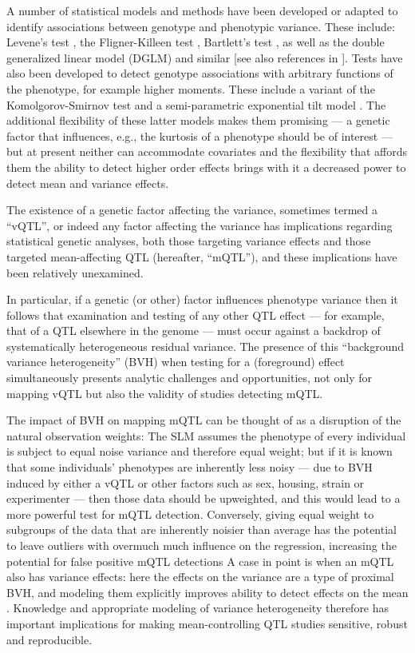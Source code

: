 A number of statistical models and methods have been developed or adapted to identify associations between genotype and phenotypic variance. 
These include: 
    Levene's test \citep{Struchalin2010},
    the Fligner-Killeen test \citep{Fraser2010},
    Bartlett's test \citep{Freund2013b},
    as well as the double generalized linear model (DGLM) and similar \citep{Ronnegard2011a, Cao2014} [see also references in \citep{Ronnegard2012}].
Tests have also been developed to detect genotype associations with arbitrary functions of the phenotype, for example higher moments.
These include a variant of the Komolgorov-Smirnov test \citep{Aschard2013} and a semi-parametric exponential tilt model \citep{Hong2016}.
The additional flexibility of these latter models makes them promising --- a genetic factor that influences, e.g., the kurtosis of a phenotype should be of interest --- but at present neither can accommodate covariates and the flexibility that affords them the ability to detect higher order effects brings with it a decreased power to detect mean and variance effects. 


The existence of a genetic factor affecting the variance, sometimes termed a ``vQTL'', or indeed any factor affecting the variance has implications regarding statistical genetic analyses, both those targeting variance effects and those targeted mean-affecting QTL (hereafter, ``mQTL''), and these implications have been relatively unexamined. 

In particular, if a genetic (or other) factor influences phenotype variance then it follows that examination and testing of any other QTL effect --- for example, that of a QTL elsewhere in the genome --- must occur against a backdrop of systematically heterogeneous residual variance.
The presence of this ``background variance heterogeneity'' (BVH) when testing for a (foreground) effect simultaneously presents analytic challenges and opportunities, not only for mapping vQTL but also the validity of studies detecting mQTL. 

The impact of BVH on mapping mQTL can be thought of as a disruption of the natural observation weights: The SLM assumes the phenotype of every individual is subject to equal noise variance and therefore equal weight; but if it is known that some individuals' phenotypes are inherently less noisy --- due to BVH induced by either a vQTL or other factors such as sex, housing, strain or experimenter --- then those data should be upweighted, and this would lead to a more powerful test for mQTL detection.
Conversely, giving equal weight to subgroups of the data that are inherently noisier than average has the potential to leave outliers with overmuch much influence on the regression, increasing the potential for false positive mQTL detections
A case in point is when an mQTL also has variance effects: here the effects on the variance are a type of proximal BVH, and modeling them explicitly improves ability to detect effects on the mean \CortyReanalysisPaper.
Knowledge and appropriate modeling of variance heterogeneity therefore has important implications for making mean-controlling QTL studies sensitive, robust and reproducible.


